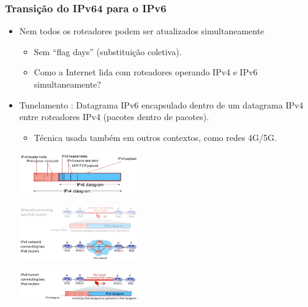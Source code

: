         \subsubsection*{Transição do IPv64 para o IPv6}
            \begin{itemize}[left=0.5cm, align=left, nosep]
                \item Nem todos os roteadores podem ser atualizados simultaneamente
                
                \begin{itemize}[left=0.5cm, nosep, label=$\hookrightarrow$]
                    \item Sem “flag days” (substituição coletiva).  
                    \item Como a Internet lida com roteadores operando IPv4 e IPv6 simultaneamente?
                \end{itemize}     

                \item Tunelamento : Datagrama IPv6 encapsulado dentro de um datagrama IPv4 entre roteadores IPv4 (pacotes dentro de pacotes). 
                \begin{itemize}[left=0.5cm, nosep, label=$\hookrightarrow$]
                    \item Técnica usada também em outros contextos, como redes 4G/5G.
                \end{itemize} 

                \begin{center}
                    \includegraphics[width=0.4\textwidth]{img/cap-04/tunelamento.png}
                \end{center}

                \begin{center}
                    \includegraphics[width=0.4\textwidth]{img/cap-04/tunelamento-encapsulamento.png}
                \end{center}

                \begin{center}
                    \includegraphics[width=0.4\textwidth]{img/cap-04/tunelamento-encapsulamento2.png}
                \end{center}


\end{itemize}
